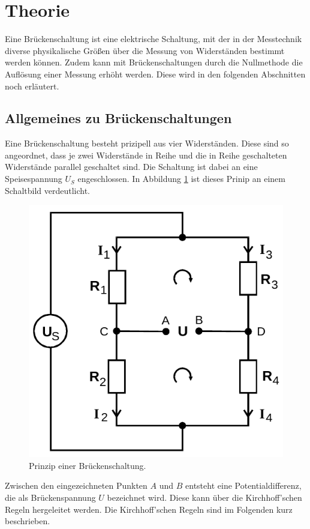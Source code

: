 \section{Theorie}
\label{sec:Theorie}
Eine Brückenschaltung ist eine elektrische Schaltung, mit der in der Messtechnik diverse physikalische Größen über die Messung von 
Widerständen bestimmt werden können. Zudem kann mit Brückenschaltungen durch die Nullmethode die Auflösung einer Messung erhöht werden.
Diese wird in den folgenden Abschnitten noch erläutert.

\subsection{Allgemeines zu Brückenschaltungen}                      
\label{sec:allg}
Eine Brückenschaltung besteht prizipell aus vier Widerständen. Diese sind so angeordnet, dass je zwei Widerstände in Reihe und 
die in Reihe geschalteten Widerstände parallel geschaltet sind. Die Schaltung ist dabei an eine Speisespannung $U_S$ engeschlossen. 
In Abbildung \ref{fig:allg} ist dieses Prinip an einem Schaltbild verdeutlicht. 

\begin{figure}[H]
    \centering
    \includegraphics[scale=0.4]{pictures/1-allg.png}
    \caption{Prinzip einer Brückenschaltung. \cite{AP01}}
    \label{fig:allg}
\end{figure}
\noindent
Zwischen den eingezeichneten Punkten $A$ und $B$ entsteht eine Potentialdifferenz, die als Brückenspannung $U$ bezeichnet wird. Diese 
kann über die Kirchhoff'schen Regeln hergeleitet werden. Die Kirchhoff'schen Regeln sind im Folgenden kurz beschrieben. 


